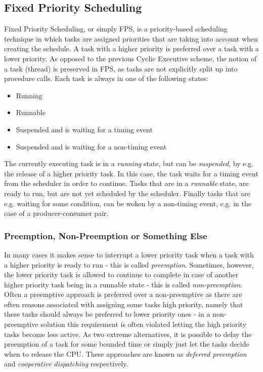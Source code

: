 
\subsection{Fixed Priority Scheduling}
Fixed Priority Scheduling, or simply FPS, is a priority-based scheduling technique in which tasks are assigned priorities that are taking into account when creating the schedule. A task with a higher priority is preferred over a task with a lower priority. As opposed to the previous Cyclic Executive scheme, the notion of a task (thread) is preserved in FPS, as tasks are not explicitly split up into procedure calls. Each task is always in one of the following states:

\begin{itemize}
	\item Running
	\item Runnable
	\item Suspended and is waiting for a timing event
	\item Suspended and is waiting for a non-timing event
\end{itemize}

The currently executing task is in a \textit{running} state, but can be \textit{suspended}, by e.g. the release of a higher priority task. In this case, the task waits for a timing event from the scheduler in order to continue. Tasks that are in a \textit{runnable} state, are ready to run, but are not yet scheduled by the scheduler. Finally tasks that are e.g. waiting for some condition, can be woken by a non-timing event, e.g. in the case of a producer-consumer pair. 

\subsubsection{Preemption, Non-Preemption or Something Else}
In many cases it makes sense to interrupt a lower priority task when a task with a higher priority is ready to run - this is called \textit{preemption}. Sometimes, however, the lower priority task is allowed to continue to complete in case of another higher priority task being in a runnable state - this is called \textit{non-preemption}. Often a preemptive approach is preferred over a non-preemptive as there are often reasons associated with assigning some tasks high priority, namely that these tasks should always be preferred to lower priority ones - in a non-preemptive solution this requirement is often violated letting the high priority tasks become less active. As two extreme alternatives, it is possible to delay the preemption of a task for some bounded time or simply just let the tasks decide when to release the CPU. These approaches are known as \textit{deferred preemption} and \textit{cooperative dispatching} respectively.

